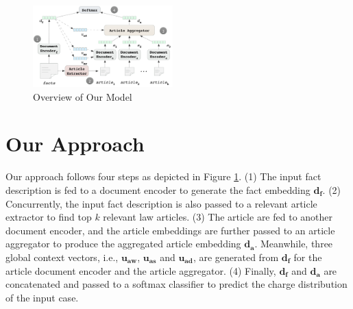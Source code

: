 
\begin{figure}[t!]
\begin{center}
\includegraphics[width=0.48\textwidth]{figures/charge_pred_overview.png}	
\caption{Overview of Our Model}
\label{fig_model_framework}
\end{center}
\end{figure}

\section{Our Approach}
Our approach follows four steps as depicted in Figure \ref{fig_model_framework}. 
(1) The input fact description is fed to a document encoder to generate the fact embedding $\mathbf{d_f}$.
(2) Concurrently, the input fact description is also passed to a relevant article extractor to find top $k$ relevant law articles. 
(3) The article are fed to another document encoder, and the article embeddings are further passed to an article aggregator to produce the aggregated article embedding $\mathbf{d_a}$. Meanwhile, three global context vectors, i.e., $\mathbf{u_{aw}}$, $\mathbf{u_{as}}$ and $\mathbf{u_{ad}}$, are generated from $\mathbf{d_f}$ for the article document encoder and the article aggregator. 
(4) Finally, $\mathbf{d_f}$ and $\mathbf{d_a}$ are concatenated and passed to a softmax classifier to predict the charge distribution of the input case.


